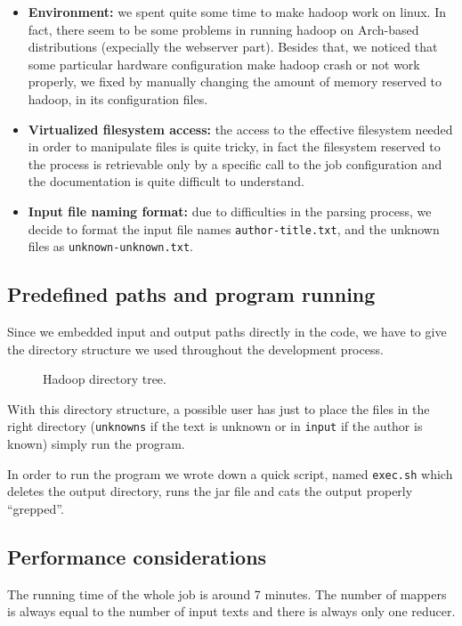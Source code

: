 \documentclass[a4paper,11pt, twoside]{article}
\begin{document}
	\begin{itemize}
		\item \textbf{Environment:} we spent quite some time to make hadoop work on linux. In fact, there seem to be some problems in running hadoop on Arch-based distributions (expecially the webserver part). Besides that, we noticed that some particular hardware configuration make hadoop crash or not work properly, we fixed by manually changing the amount of memory reserved to hadoop, in its configuration files.
		
		\item \textbf{Virtualized filesystem access:} the access to the effective filesystem needed in order to manipulate files is quite tricky, in fact the filesystem reserved to the process is retrievable only by a specific call to the job configuration and the documentation is quite difficult to understand.
		
		\item \textbf{Input file naming format:} due to difficulties in the parsing process, we decide to format the input file names \texttt{author-title.txt}, and the unknown files as \texttt{unknown-unknown.txt}.
	\end{itemize}

	\subsection{Predefined paths and program running}
	Since we embedded input and output paths directly in the code, we have to give the directory structure we used throughout the development process. 
	\begin{figure}[h!]
	\caption{Hadoop directory tree.}
	\end{figure}

	With this directory structure, a possible user has just to place the files in the right directory (\lstinline|unknowns| if the text is unknown or in \lstinline|input| if the author is known) simply run the program.
	
	In order to run the program we wrote down a quick script, named \lstinline|exec.sh| which deletes the output directory, runs the jar file and cats the output properly ``grepped''.

	\subsection{Performance considerations} %
	The running time of the whole job is around 7 minutes. The number of mappers is always equal to the number of input texts and there is always only one reducer.
	

	\newpage
	\printbibheading
	\printbibliography[nottype=book,heading=subbibliography,title={Online Sources}]
\end{document}
